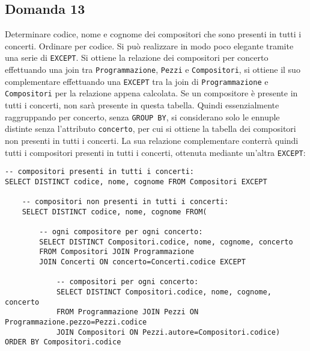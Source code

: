 \documentclass{article}
\numberwithin{equation}{subsection}
\begin{document}
\subsection*{Domanda 13}
Determinare codice, nome e cognome dei compositori che sono presenti in tutti i concerti. Ordinare per codice. Si può realizzare in modo poco elegante tramite una serie di \verb|EXCEPT|. Si ottiene la 
relazione dei compositori per concerto effettuando una join tra \verb|Programmazione|, \verb|Pezzi| e \verb|Compositori|, si ottiene il suo complementare effettuando una \verb|EXCEPT| tra la join di \verb|Programmazione| e 
\verb|Compositori| per la relazione appena calcolata. Se un compositore è presente in tutti i concerti, non sarà presente in questa tabella. Quindi essenzialmente raggruppando per concerto, senza \verb|GROUP BY|, si 
considerano solo le ennuple distinte senza l'attributo \verb|concerto|, per cui si ottiene la tabella dei compositori non presenti in tutti i concerti. La sua relazione complementare conterrà quindi tutti i compositori 
presenti in tutti i concerti, ottenuta mediante un'altra \verb|EXCEPT|:
\begin{verbatim}
-- compositori presenti in tutti i concerti:
SELECT DISTINCT codice, nome, cognome FROM Compositori EXCEPT
    
    -- compositori non presenti in tutti i concerti:
    SELECT DISTINCT codice, nome, cognome FROM(

        -- ogni compositore per ogni concerto:
        SELECT DISTINCT Compositori.codice, nome, cognome, concerto
        FROM Compositori JOIN Programmazione 
        JOIN Concerti ON concerto=Concerti.codice EXCEPT

            -- compositori per ogni concerto:
            SELECT DISTINCT Compositori.codice, nome, cognome, concerto
            FROM Programmazione JOIN Pezzi ON Programmazione.pezzo=Pezzi.codice
            JOIN Compositori ON Pezzi.autore=Compositori.codice)
ORDER BY Compositori.codice
\end{verbatim}
\end{document}
